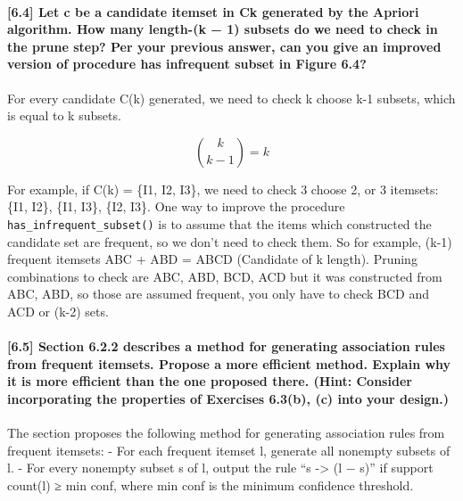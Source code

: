 \documentclass[11pt]{article}
\begin{document}
    \paragraph{{[}6.4{]} Let c be a candidate itemset in Ck generated by the
Apriori algorithm. How many length-(k − 1) subsets do we need to check
in the prune step? Per your previous answer, can you give an improved
version of procedure has infrequent subset in Figure
6.4?}\label{let-c-be-a-candidate-itemset-in-ck-generated-by-the-apriori-algorithm.-how-many-length-k-1-subsets-do-we-need-to-check-in-the-prune-step-per-your-previous-answer-can-you-give-an-improved-version-of-procedure-has-infrequent-subset-in-figure-6.4}

    For every candidate C(k) generated, we need to check k choose k-1
subsets, which is equal to k subsets.

\[ {k \choose k-1} = k\]

For example, if C(k) = \{I1, I2, I3\}, we need to check 3 choose 2, or 3
itemsets: \{I1, I2\}, \{I1, I3\}, \{I2, I3\}. One way to improve the
procedure \texttt{has\_infrequent\_subset()} is to assume that the items
which constructed the candidate set are frequent, so we don't need to
check them. So for example, (k-1) frequent itemsets ABC + ABD = ABCD
(Candidate of k length). Pruning combinations to check are ABC, ABD,
BCD, ACD but it was constructed from ABC, ABD, so those are assumed
frequent, you only have to check BCD and ACD or (k-2) sets.

    \paragraph{{[}6.5{]} Section 6.2.2 describes a method for generating
association rules from frequent itemsets. Propose a more efficient
method. Explain why it is more efficient than the one proposed there.
(Hint: Consider incorporating the properties of Exercises 6.3(b), (c)
into your
design.)}\label{section-6.2.2-describes-a-method-for-generating-association-rules-from-frequent-itemsets.-propose-a-more-efficient-method.-explain-why-it-is-more-efficient-than-the-one-proposed-there.-hint-consider-incorporating-the-properties-of-exercises-6.3b-c-into-your-design.}

    The section proposes the following method for generating association
rules from frequent itemsets: - For each frequent itemset l, generate
all nonempty subsets of l. - For every nonempty subset s of l, output
the rule ``s -\textgreater{} (l − s)'' if support count(l) ≥ min conf,
where min conf is the minimum confidence threshold.
\end{document}
